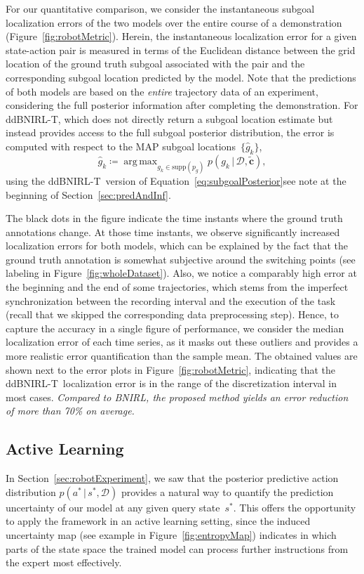 \documentclass[twoside,11pt]{article}
\newcommand{\given}{\,\vert\,}
\newcommand{\supp}{\text{supp}}
\DeclareMathOperator*{\argmax}{arg\,max}
\newcommand{\defeq}{\coloneqq}
\newcommand{\nachschub}[1]{\Emdash*#1}
\newcommand{\ddBNIRLT}{\mbox{ddBNIRL-T}}
\begin{document}
For our quantitative comparison, we consider the instantaneous subgoal localization errors of the two models over the entire course of a demonstration (Figure~\ref{fig:robotMetric}). Herein, the instantaneous localization error for a given state-action pair is measured in terms of the Euclidean distance between the grid location of the ground truth subgoal associated with the pair and the corresponding subgoal location predicted by the model. Note that the predictions of both models are based on the \textit{entire} trajectory data of an experiment, considering the full posterior information %
after completing the demonstration.
%
For ddBNIRL-T, which does not directly return a subgoal location estimate but instead provides access to the full subgoal posterior distribution, the error is computed with respect to
%
 the MAP subgoal locations~$\{\hat{g}_k\}$,
\begin{equation*}
	\hat{g}_k \defeq \argmax_{g_k\in\supp(p_g)}p(g_k \given \mathcal{D}, \mathbf{\tilde{c}}), 
\end{equation*}
using the \ddBNIRLT\ version of Equation~\eqref{eq:subgoalPosterior}\nachschub{see note at the beginning of Section~\ref{sec:predAndInf}}.

The black dots in the figure indicate the time instants where the ground truth annotations change. At those time instants, %
we observe significantly increased localization errors for both models, %
which can be explained by the fact that %
%
the ground truth annotation is somewhat %
subjective
%
around the switching points (see labeling in Figure~\ref{fig:wholeDataset}). Also, we notice a comparably high error at the beginning and the end of some 
%
trajectories, which stems from the imperfect synchronization between the recording interval and the execution of the task (recall that we %
%
skipped the corresponding data preprocessing step). Hence, to capture the %
accuracy in %
a single figure of performance, we consider the median localization error of each time series, as it masks out these outliers and provides a more realistic error quantification than the sample mean. %
The obtained values are shown next to the error plots in Figure~\ref{fig:robotMetric}, indicating that the \ddBNIRLT\  localization error is in the range of the discretization %
interval in most cases. \textit{Compared to BNIRL, the proposed method yields an error reduction of more than 70\% on average.}




\subsection{Active Learning}
\label{sec:activeLearning}
In Section~\ref{sec:robotExperiment}, %
we saw that the posterior predictive action distribution $p(a^* \given s^*, \mathcal{D})$ %
provides a natural way to quantify the prediction uncertainty of our model at any given query state~$s^*$. This offers the opportunity to apply the framework in an active learning setting, since the induced uncertainty map (see example in Figure~\ref{fig:entropyMap}) indicates in which parts of the state space the trained model %
can process further instructions from the expert most effectively. 
\end{document}
